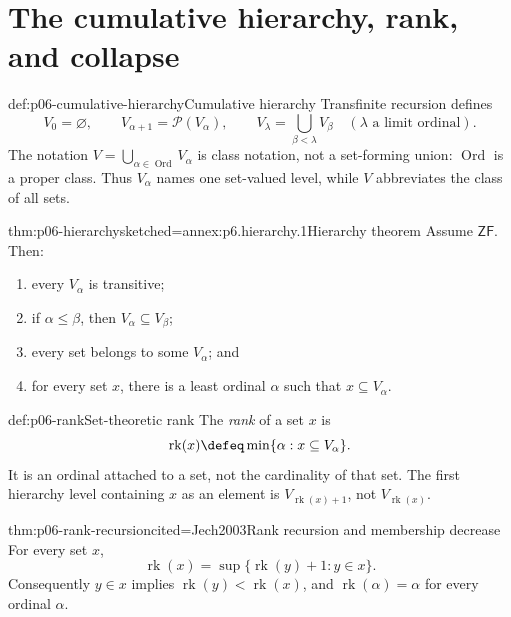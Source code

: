 \section{The cumulative hierarchy, rank, and collapse}
\label{sec:p06-cumulative-hierarchy}

\begin{hbdefinition}{def:p06-cumulative-hierarchy}{Cumulative hierarchy}
Transfinite recursion defines
\[
 V_0=\varnothing,
 \qquad
 V_{\alpha+1}=\mathcal P(V_\alpha),
 \qquad
 V_\lambda=\bigcup_{\beta<\lambda}V_\beta
 \quad(\lambda\text{ a limit ordinal}).
\]
The notation
\(V=\bigcup_{\alpha\in\operatorname{Ord}}V_\alpha\) is class notation, not a
set-forming union: \(\operatorname{Ord}\) is a proper class.  Thus
\(V_\alpha\) names one set-valued level, while \(V\) abbreviates the class of
all sets.
\end{hbdefinition}

\begin{hbtheorem}{thm:p06-hierarchy}{sketched=annex:p6.hierarchy.1}{Hierarchy theorem}
Assume \(\mathsf{ZF}\).  Then:
\begin{enumerate}
 \item every \(V_\alpha\) is transitive;
 \item if \(\alpha\leq\beta\), then \(V_\alpha\subseteq V_\beta\);
 \item every set belongs to some \(V_\alpha\); and
 \item for every set \(x\), there is a least ordinal \(\alpha\) such that
       \(x\subseteq V_\alpha\).
\end{enumerate}
\end{hbtheorem}

\begin{hbdefinition}{def:p06-rank}{Set-theoretic rank}
The \emph{rank} of a set \(x\) is
\[
 \operatorname{rk}(x)\defeq
 \min\{\alpha:x\subseteq V_\alpha\}.
\]
It is an ordinal attached to a set, not the cardinality of that set.  The first
hierarchy level containing \(x\) as an element is
\(V_{\operatorname{rk}(x)+1}\), not \(V_{\operatorname{rk}(x)}\).
\end{hbdefinition}

\begin{hbtheorem}{thm:p06-rank-recursion}{cited=Jech2003}{Rank recursion and membership decrease}
For every set \(x\),
\[
 \operatorname{rk}(x)=
 \sup\{\operatorname{rk}(y)+1:y\in x\}.
\]
Consequently \(y\in x\) implies
\(\operatorname{rk}(y)<\operatorname{rk}(x)\), and
\(\operatorname{rk}(\alpha)=\alpha\) for every ordinal \(\alpha\).
\end{hbtheorem}

